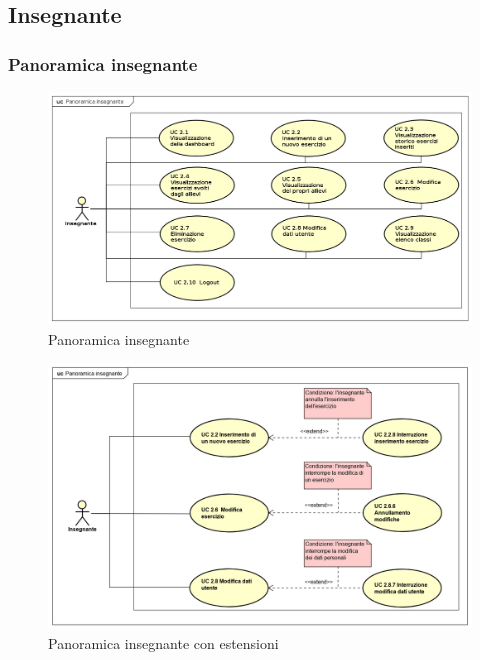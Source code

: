 \subsection{Insegnante}
\subsubsection{Panoramica insegnante}
\begin{figure}[H]
\centering
\includegraphics[width=17cm, keepaspectratio]{img/PanoramicaInsegnanti.png} 
\caption{Panoramica insegnante}
\end{figure}

\begin{figure}[H]
\centering
\includegraphics[width=17cm, keepaspectratio]{img/PanoramicaInsegnanticonext.png} 
\caption{Panoramica insegnante con estensioni}
\end{figure}

